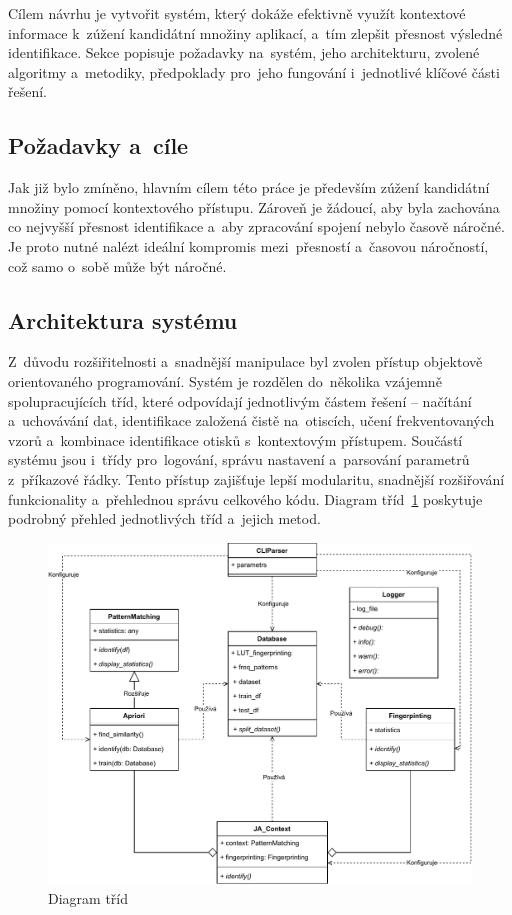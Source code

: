 Cílem návrhu je vytvořit systém, který dokáže efektivně využít kontextové informace k~zúžení kandidátní množiny aplikací, a~tím zlepšit přesnost výsledné identifikace. Sekce popisuje požadavky na~systém, jeho architekturu, zvolené algoritmy a~metodiky, předpoklady pro~jeho fungování i~jednotlivé klíčové části řešení.


\subsection{Požadavky a~cíle}

Jak již bylo zmíněno, hlavním cílem této práce je především zúžení kandidátní množiny pomocí kontextového přístupu. Zároveň je žádoucí, aby byla zachována co nejvyšší přesnost identifikace a~aby zpracování spojení nebylo časově náročné. Je proto nutné nalézt ideální kompromis mezi~přesností a~časovou náročností, což samo o~sobě může být náročné.

\subsection{Architektura systému}
\label{sub:architecture}
Z~důvodu rozšiřitelnosti a~snadnější manipulace byl zvolen přístup objektově orientovaného programování. Systém je rozdělen do~několika vzájemně spolupracujících tříd, které odpovídají jednotlivým částem řešení – načítání a~uchovávání dat, identifikace založená čistě na~otiscích, učení frekventovaných vzorů a~kombinace identifikace otisků s~kontextovým přístupem. Součástí systému jsou i~třídy pro~logování, správu nastavení a~parsování parametrů z~příkazové řádky. Tento přístup zajišťuje lepší modularitu, snadnější rozšiřování funkcionality a~přehlednou správu celkového kódu. Diagram tříd~\ref{fig:class-dia} poskytuje podrobný přehled jednotlivých tříd a~jejich metod.

\begin{figure}[H]
	\centering
	\includegraphics[width=\textwidth]{obrazky-figures/class-dia.drawio.pdf}
	\caption{Diagram tříd}
	\label{fig:class-dia}
\end{figure}



